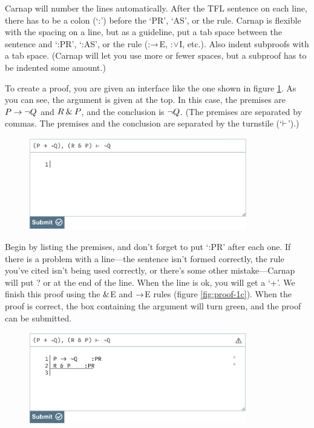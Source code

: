 Carnap will number the lines automatically. After the TFL  sentence on each line, there has to be a colon (`:') before the `PR', `AS', or the rule. Carnap is flexible with the spacing on a line, but as a guideline, put a tab space between the sentence and `:PR', `:AS', or the rule (:$\rightarrow$E, :$\vee$I, etc.). Also indent subproofs with a tab space. (Carnap will let you use more or fewer spaces, but a subproof has to be indented some amount.)

To create a proof, you are given an interface like the one shown in figure \ref{fig:proof-1a}. As you can see, the argument is given at the top. In this case, the premises are $P \rightarrow {\neg} Q$ and $R \mathbin{\&} P$, and the conclusion is ${\neg} Q$. (The premises are separated by commas. The premises and the conclusion are separated by the turnstile (`$\vdash$').)

\begin{figure}
\includegraphics[width=9.5cm]{textbook--1a.PNG}
\caption{}
\label{fig:proof-1a}
\end{figure}

Begin by listing the premises, and don't forget to put `:PR' after each one. If there is a problem with a line---the sentence isn't formed correctly, the rule you've cited isn't being used correctly, or there's some other mistake---Carnap will put \textsf{?} or {\selectfont{}\relax} at the end of the line. When the line is ok, you will get a `+'. 
We finish this proof using the $\mathbin{\&}$E and $\rightarrow$E rules (figure \ref{fig:proof-1c}). When the proof is correct, the box containing the argument will turn green, and the proof can be submitted. 

\begin{figure}[h]
\includegraphics[width=9.5cm]{textbook--1b.PNG}
\caption{}
\label{fig:proof-1b}
\end{figure}

